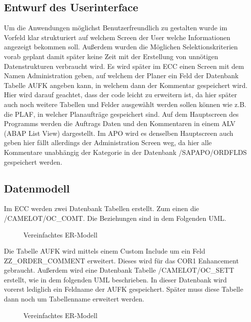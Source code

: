 \subsection{Entwurf des Userinterface}
\label{sec:Benutzeroberflaeche} 
Um die Anwendungen möglichst Benutzerfreundlich zu gestalten wurde im Vorfeld klar strukturiert auf welchem Screen der User welche Informationen angezeigt bekommen soll. Außerdem wurden die Möglichen Selektionskriterien vorab geplant damit später keine Zeit mit der Erstellung von unnötigen Datenstrukturen verbraucht wird. Es wird später im \ac*{ECC} einen Screen mit dem Namen Administration geben, auf welchem der Planer ein Feld der Datenbank Tabelle AUFK angeben kann, in welchem dann der Kommentar gespeichert wird. Hier wird darauf geachtet, dass der code leicht zu erweitern ist, da hier später auch noch weitere Tabellen und Felder ausgewählt werden sollen können wie z.B. die PLAF, in welcher Planaufträge gespeichert sind. Auf dem Hauptscreen des Programms werden die Auftrags Daten und den Kommentaren in einem ALV (ABAP List View) dargestellt. Im APO wird es denselben Hauptscreen auch geben hier fällt allerdings der Administration Screen weg, da hier alle Kommentare unabhängig der Kategorie in der Datenbank /SAPAPO/ORDFLDS gespeichert werden. 

\subsection{Datenmodell}
\label{sec:Datenmodell}
Im ECC werden zwei Datenbank Tabellen erstellt. Zum einen die /CAMELOT/OC\_COMT. Die Beziehungen sind in dem Folgenden \ac*{UML}.

\begin{figure}[htb]
\centering
{}
\caption{Vereinfachtes ER-Modell}
\label{fig:ECC01}
\end{figure} 

Die Tabelle AUFK wird mittels einem Custom Include um ein Feld ZZ\_ORDER\_COMMENT erweitert. Dieses wird für das COR1 Enhancement gebraucht. Außerdem wird eine Datenbank Tabelle /CAMELOT/OC\_SETT erstellt, wie in dem folgenden \ac*{UML} beschrieben. In dieser Datenbank wird vorerst lediglich ein Feldname der AUFK gespeichert. Später muss diese Tabelle dann noch um Tabellenname erweitert werden.

\begin{figure}[htb]
	\centering
	\caption{Vereinfachtes ER-Modell}
	\label{fig:ECC02}
\end{figure} 

